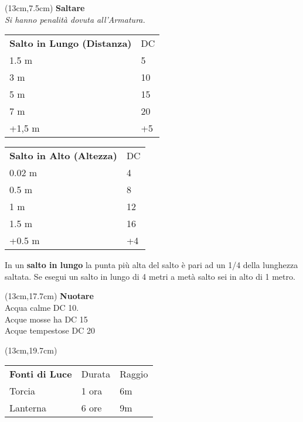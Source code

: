 \documentclass[a4paper,12 pt,openany]{book}
\begin{document}
\begin{textblock*}{7cm}(13cm,7.5cm) %
\textbf{Saltare}\\
\textit{Si hanno penalità dovuta all'Armatura.}

\begin{tabular}{ll}
	\textbf{Salto in Lungo (Distanza)} & DC\\
	1.5 m                              & 5  \\
	3 m                                & 10\\
	5 m                                & 15 \\	
	7 m                                & 20 \\	
	+1,5 m                             & +5	\\
\end{tabular}

\begin{tabular}{ll}
\textbf{Salto in Alto (Altezza)} & DC\\
	0.02 m                           & 4\\
	0.5 m                            & 8\\
	1 m                              & 12\\
	1.5 m                            & 16\\
	+0.5 m                           & +4\\
\end{tabular}

In un \textbf{salto in lungo} la punta più alta del salto è pari ad un 1/4 della lunghezza saltata. Se esegui un salto in lungo di 4 metri a metà salto sei in alto di 1 metro. 

\end{textblock*}	

\begin{textblock*}{7cm}(13cm,17.7cm) %
\textbf{Nuotare}\\
Acqua calme DC 10.\\
Acque mosse ha DC 15\\
Acque tempestose DC 20
\end{textblock*}	

\begin{textblock*}{7cm}(13cm,19.7cm) %

\begin{tabular}{lll}
\textbf{Fonti di Luce} & Durata&Raggio\\
Torcia& 1 ora & 6m\\
Lanterna & 6 ore & 9m\\
\end{tabular}

\end{textblock*}	
\end{document}
